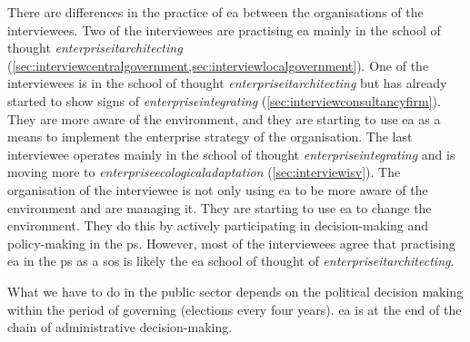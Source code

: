 There are differences in the practice of \acrshort{ea} between the organisations of the interviewees. Two of the interviewees are practising \acrshort{ea} mainly in the school of thought \textit{\gls{enterpriseitarchitecting}} (\cref{sec:interviewcentralgovernment,sec:interviewlocalgovernment}). One of the interviewees is in the school of thought \textit{\gls{enterpriseitarchitecting}} but has already started to show signs of \textit{\gls{enterpriseintegrating}} (\cref{sec:interviewconsultancyfirm}). They are more aware of the environment, and they are starting to use \acrshort{ea} as a means to implement the enterprise strategy of the organisation. The last interviewee operates mainly in the school of thought \textit{\gls{enterpriseintegrating}} and is moving more to \textit{\gls{enterpriseecologicaladaptation}} (\cref{sec:interviewisv}). The organisation of the interviewee is not only using \acrshort{ea} to be more aware of the environment and are managing it. They are starting to use \acrshort{ea} to change the environment. They do this by actively participating in decision-making and policy-making in the \gls{ps}. However, most of the interviewees agree that practising \acrshort{ea} in the \gls{ps} as a \acrlong{sos} is likely the \acrshort{ea} school of thought of \textit{\gls{enterpriseitarchitecting}}.



What we have to do in the public sector depends on the political decision making within the period of governing (elections every four years). \acrshort{ea} is at the end of the chain of administrative decision-making.

